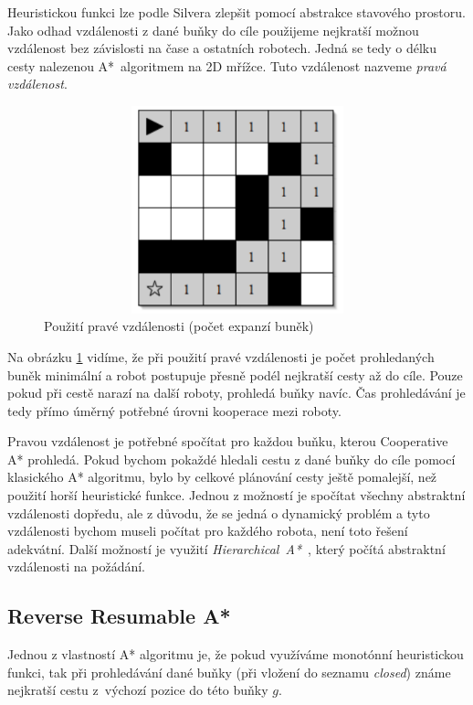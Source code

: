 Heuristickou funkci lze podle Silvera \cite{Silver2005} zlepšit pomocí abstrakce stavového prostoru.  Jako odhad vzdálenosti z dané buňky do cíle použijeme nejkratší možnou vzdálenost bez závislosti na čase a ostatních robotech. Jedná se tedy o délku cesty nalezenou A*~algoritmem na 2D mřížce. Tuto vzdálenost nazveme \emph{pravá vzdálenost}.

\begin{figure}[htb]
	\begin{center}
		\includegraphics*[width=15cm,height=6cm,keepaspectratio]{obr/hierarchCoopMetric}
	\end{center}
	\caption[caption]{Použití pravé vzdálenosti (počet expanzí buněk) \cite{Silver2006}}
	\label{obr:hierarchCoopMetric}
\end{figure}

Na obrázku \ref{obr:hierarchCoopMetric} vidíme, že při použití pravé vzdálenosti je počet prohledaných buněk minimální a robot postupuje přesně podél nejkratší cesty až do cíle. Pouze pokud při cestě narazí na další roboty, prohledá buňky navíc. Čas prohledávání je tedy přímo úměrný potřebné úrovni kooperace mezi roboty.

Pravou vzdálenost je potřebné spočítat pro každou buňku, kterou Cooperative A* prohledá. Pokud bychom pokaždé hledali cestu z dané buňky do cíle pomocí klasického A* algoritmu, bylo by celkové plánování cesty ještě pomalejší, než použití horší heuristické funkce. Jednou z možností je spočítat všechny abstraktní vzdálenosti dopředu, ale z důvodu, že se jedná o dynamický problém a tyto vzdálenosti bychom museli počítat pro každého robota, není toto řešení adekvátní. Další možností je využití \emph{Hierarchical~A*}~\cite{Holte1996}, který počítá abstraktní vzdálenosti na požádání.

\subsection{Reverse Resumable A*}
Jednou z vlastností A* algoritmu je, že pokud využíváme monotónní heuristickou funkci, tak při prohledávání dané buňky (při vložení do seznamu \emph{closed}) známe nejkratší cestu z~výchozí pozice do této buňky $g$.

